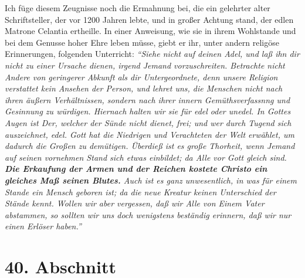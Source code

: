 Ich füge diesem Zeugnisse noch die Ermahnung bei, die ein gelehrter alter
Schriftsteller, der vor 1200 Jahren lebte, und in großer Achtung stand, der
edlen Matrone Celantia ertheille. In einer Anweisung, wie sie in ihrem
Wohlstande und bei dem Genusse hoher Ehre leben müsse, giebt er ihr, unter
andern religöse Erinnerungen, folgenden Unterricht:
\textit{"`Siehe nicht auf deinen
Adel, und laß ihn dir nicht zu einer Ursache dienen, irgend Jemand
vorzuschreiten. Betrachte nicht Andere von geringerer Abkunft als dir
Untergeordnete, denn unsere Religion verstattet kein Ansehen der Person, und
lehret uns, die Menschen nicht nach ihren äußern Verhältnissen, sondern nach
ihrer innern Gemüthsverfassnng und Gesinnung zu würdigen. Hiernach halten wir
sie für edel oder unedel. In Gottes Augen ist Der, welcher der Sünde nicht
dienet, frei; und wer durch Tugend sich auszeichnet, edel. Gott hat die
Niedrigen und Verachteten der Welt erwählet, um dadurch die Großen zu demütigen.
Überdieß ist es große Thorheit, wenn Jemand auf seinen vornehmen Stand sich
etwas einbildet; da Alle vor Gott gleich sind. \label{ref:09_39_erettung}
\textbf{Die Erkaufung der Armen und der
Reichen kostete Christo ein gleiches Maß seinen Blutes.} Auch ist es ganz
unwesentlich, in was für einem Stande ein Mensch geboren ist; da die neue
Kreatur keinen Unterschied der Stände kennt. Wollen wir aber vergessen, daß wir
Alle von Einem Vater abstammen, so sollten wir uns doch wenigstens beständig
erinnern, daß wir nur einen Erlöser haben."'}

\section{40. Abschnitt} \label{kap9_ab40}

